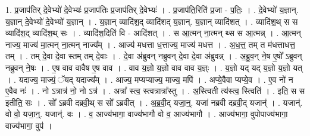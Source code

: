 \documentclass[17pt]{extarticle}
\begin{document}
1. प्र॒जाप॑तिर् दे॒वेभ्यो॑ दे॒वेभ्यः॑ प्र॒जाप॑तिः प्र॒जाप॑तिर् दे॒वेभ्यः॑ । . प्र॒जाप॑ति॒रिति॑ प्र॒जा - प॒तिः॒ । . दे॒वेभ्यो॑ य॒ज्ञान्. य॒ज्ञान् दे॒वेभ्यो॑ दे॒वेभ्यो॑ य॒ज्ञान् । . य॒ज्ञान् व्यादि॑श॒द् व्यादि॑शद् य॒ज्ञान्. य॒ज्ञान् व्यादि॑शत् । . व्यादि॑श॒थ् स स व्यादि॑श॒द् व्यादि॑श॒थ् सः । . व्यादि॑श॒दिति॑ वि - आदि॑शत् । . स आ॒त्मन् ना॒त्मन् थ्स स आ॒त्मन्न् । . आ॒त्मन् नाज्य॒ माज्य॑ मा॒त्मन् ना॒त्मन् नाज्य᳚म् । . आज्य॑ मधत्ता ध॒त्ताज्य॒ माज्य॑ मधत्त । . अ॒ध॒त्त॒ तम् त म॑धत्ताधत्त॒ तम् । . तम् दे॒वा दे॒वा स्तम् तम् दे॒वाः । . दे॒वा अ॑ब्रुवन् नब्रुवन् दे॒वा दे॒वा अ॑ब्रुवन्न् । . अ॒ब्रु॒व॒न् ने॒ष ए॒षो᳚ ऽब्रुवन् नब्रुवन् ने॒षः । . ए॒ष वाव वावैष ए॒ष वाव । . वाव य॒ज्ञो य॒ज्ञो वाव वाव य॒ज्ञ्ः । . य॒ज्ञो यद् यद् य॒ज्ञो य॒ज्ञो यत् । . यदाज्य॒ माज्यं॒ ॅयद् यदाज्य᳚म् । . आज्य॒ मप्यप्याज्य॒ माज्य॒ मपि॑ । . अप्ये॒वैवा प्यप्ये॒व । . ए॒व नो॑ न ए॒वैव नः॑ । . नो ऽत्रात्र॑ नो॒ नो ऽत्र॑ । . अत्रा᳚ स्त्व॒ स्त्वत्रात्रा᳚स्तु । . अ॒स्त्विती त्य॑स्त्व॒ स्त्विति॑ । . इति॒ स स इतीति॒ सः । . सो᳚ ऽब्रवी दब्रवी॒थ् स सो᳚ ऽब्रवीत् । . अ॒ब्र॒वी॒द् यजा॒न्॒. यजा॑ नब्रवी दब्रवी॒द् यजान्॑ । . यजान्॑. वो वो॒ यजा॒न्॒. यजान्॑. वः । . व॒ आज्य॑भागा॒ वाज्य॑भागौ वो व॒ आज्य॑भागौ । . आज्य॑भागा॒ वुपोपाज्य॑भागा॒ वाज्य॑भागा॒ वुप॑ । \newline
\end{document}
